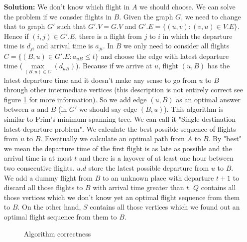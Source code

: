 \documentclass{book}
\begin{document}
\begin{enumerate}
\begin{enumerate}
\begin{itemize}
			\item[\textbf{Solution:}] We don't know which flight in $A$ we should choose. We can solve the problem if we consder flights in $B$. Given the graph $G$, we need to change that to graph $G'$ such that $G'.V = G.V$ and $G'.E = \{(u, v) : (v, u) \in V.E\}$. Hence if $(i, j) \in G'.E$, there is a flight from $j$ to $i$ in which the departure time is $d_{ji}$ and arrival time is $a_{ji}$. In $B$ we only need to consider all flights $C = \{(B, u) \in G'.E : a_{uB} \le t\}$ and choose the edge with latest departure time ($\max\limits_{(B, u) \in C}(d_{uB})$). Because if we arrive at $u$, flight $(u, B)$ has the latest departure time and it doesn't make any sense to go from $u$ to $B$ through other intermediate vertices (this description is not entirely correct see figure \ref{fig:latest_departure} for more information). So we add edge $(u, B)$ as an optimal answer between $u$ and $B$ (in $G'$ we should say edge $(B, u)$). This algorithm is similar to Prim's minimum spanning tree. We can call it "Single-destination latest-departure problem". We calculate the best possible sequence of flights from $u$ to $B$. Eventually we calculate an optimal path from $A$ to $B$. By "best" we mean the departure time of the first flight is as late as possible and the arrival time is at most $t$ and there is a layover of at least one hour between two consecutive flights. $u.d$ store the latest possible departure from $u$ to $B$. We add a dummy flight from $B$ to an unknown place with departure $t + 1$ to discard all those flights to $B$ with arrival time greater than $t$. $Q$ contains all those vertices which we don't know yet an optimal flight sequence from them to $B$. On the other hand, $S$ contains all those vertices which we found out an optimal flight sequence from them to $B$.
			\begin{figure}
			\centering
			\caption{Algorithm correctness}
			\label{fig:latest_departure}

\end{figure}
\end{itemize}
\end{enumerate}
\end{enumerate}
\end{document}
